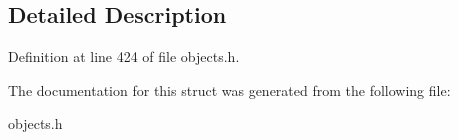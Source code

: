 \subsection{Detailed Description}


Definition at line 424 of file objects.\+h.



The documentation for this struct was generated from the following file\+:\begin{DoxyCompactItemize}
\item 
objects.\+h\end{DoxyCompactItemize}
